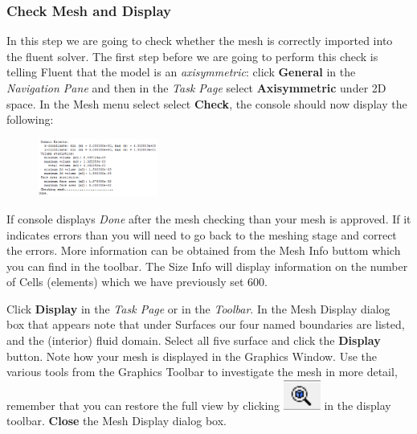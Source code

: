 \documentclass[11pt,a4paper,oneside,hidelinks]{scrartcl}
\newcommand\bfr[1]{\textcolor[rgb]{1,0.00,0.00}{\textbf{\textsf{#1}}}}
\begin{document}
\subsubsection{Check Mesh and Display}
In this step we are going to check whether the mesh is correctly imported into the fluent solver. The first step before we are going to perform this check is telling Fluent that the model is an \emph{axisymmetric}: click \bfr{General} in the \emph{Navigation Pane} and then in the \emph{Task Page} select \bfr{Axisymmetric} under 2D space. In the Mesh menu select select \bfr{Check}, the console should now display the following:
\begin{figure}[H]
\begin{center}
\includegraphics[width=0.35\textwidth,clip]{mesh_check_commandpane.png}
\end{center}
\end{figure}

If console displays \emph{Done} after the mesh checking than your mesh is approved. If it indicates errors than you will need to go back to the meshing stage and correct the errors. More information can be obtained from the Mesh Info buttom which you can find in the toolbar. The Size Info will display information on the number of Cells (elements) which we have previously set 600.

Click \bfr{Display} in the \emph{Task Page} or in the \emph{Toolbar}. In the Mesh Display dialog box that appears note that under Surfaces our four named boundaries are listed, and the (interior) fluid domain. Select all five surface and click the \bfr{Display} button. Note how your mesh is displayed in the Graphics Window. Use the various tools from the Graphics Toolbar to investigate the mesh in more detail, remember that you can restore the full view by clicking \includegraphics[width=.5cm]{zoom_to_fit.png} in the display toolbar. \bfr{Close} the Mesh Display dialog box.
\end{document}
